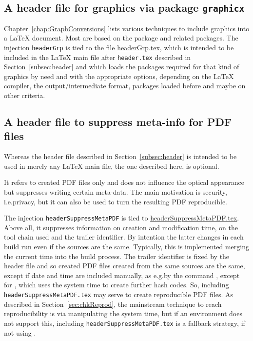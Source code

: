 \subsection{A header file for graphics via package \texttt{graphicx} }%
\label{subsec:headerGrp}

Chapter~\ref{chap:GraphConversions} lists various techniques 
to include graphics into a \LaTeX{} document. 
Most are based on the package  and related packages. 
The injection \texttt{headerGrp} 
is tied to the file \href{\urlSite fromTex/headerGrp.tex}{headerGrp.tex}, 
which is intended to be included in the \LaTeX{} main file 
after \texttt{header.tex} described in Section~\ref{subsec:header} 
and which loads the packages required for that kind of graphics 
by need and with the appropriate options, 
depending on the \LaTeX{} compiler, the output/intermediate format, 
packages loaded before and maybe on other criteria. 


\subsection{A header file to suppress meta-info for PDF files }\label{subsec:headerSuppressMetaPDF}

Whereas the header file described in Section~\ref{subsec:header} is intended to be used 
in merely any \LaTeX{} main file, 
the one described here, is optional. 

It refers to created PDF files only and does not influence the optical appearance 
but suppresses writing certain meta-data. 
The main motivation is security, i.e.\@ privacy, 
but it can also be used to turn the resulting PDF reproducible. 

The injection \texttt{headerSuppressMetaPDF} 
is tied to \href{\urlSite fromTex/headerSuppressMetaPDF.tex}{headerSuppressMetaPDF.tex}. 
Above all, it suppresses information on creation and modification time, on the tool chain used 
and the trailer identifier. 
By intention the latter changes in each build run even if the sources are the same. 
Typically, this is implemented merging the current time into the build process. 
The trailer identifier is fixed by the header file 
and so created PDF files created from the same sources are the same, 
except if date and time are included manually, as e.g.\@ by the command , 
except for \xelatex, which uses the system time to create further hash codes. 
So, including \texttt{headerSuppressMetaPDF.tex} may serve to create reproducible PDF files. 
As described in Section~\ref{sec:chkReprod}, 
the mainstream technique to reach reproducibility 
is via manipulating the system time, 
but if an environment does not support this, 
including \texttt{headerSuppressMetaPDF.tex} is a fallback strategy, 
if not using \xelatex. 

